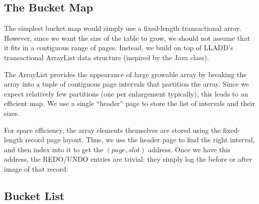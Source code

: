 \documentclass[10pt,letterpaper,twocolumn,english]{article}
\newcommand{\yad}{LLADD\xspace}
\newcommand{\rcs}[1]{\textcolor{green}{\bf RCS: #1}}
\begin{document}
\subsection{The Bucket Map}

The simplest bucket map would simply use a fixed-length transactional
array. However, since we want the size of the table to grow, we should
not assume that it fits in a contiguous range of pages. Instead, we build
on top of \yad's transactional ArrayList data structure (inspired by
the Java class).

The ArrayList provides the appearance of large growable array by
breaking the array into a tuple of contiguous page intervals that
partition the array.  Since we expect relatively few partitions (one
per enlargement typically), this leads to an efficient map. We use a
single ``header'' page to store the list of intervals and their sizes.

For space efficiency, the array elements themselves are stored using
the fixed-length record page layout. Thus, we use the header page to
find the right interval, and then index into it to get the $(page,
slot)$ address.  Once we have this address, the REDO/UNDO entries are
trivial: they simply log the before or after image of that record.






\subsection{Bucket List}
\end{document}

